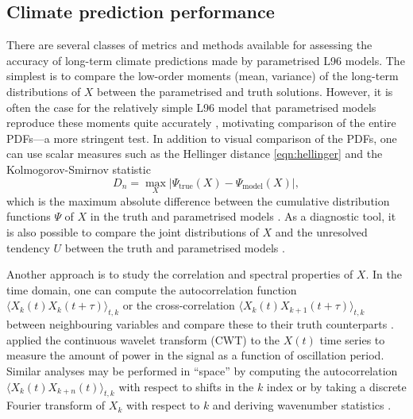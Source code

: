 \documentclass[../main.tex]{subfiles}
\begin{document}
\subsection{Climate prediction performance}
There are several classes of metrics and methods available for assessing the
accuracy of long-term climate predictions made by parametrised L96 models. The
simplest is to compare the low-order moments (mean, variance) of the long-term
distributions of $X$ between the parametrised and truth solutions. However, it
is often the case for the relatively simple L96 model that parametrised models
reproduce these moments quite accurately \parencite{wilks2005}, motivating
comparison of the entire PDFs---a more stringent test. In addition to visual
comparison of the PDFs, one can use scalar measures such as the Hellinger
distance \cref{eqn:hellinger} \parencite{arnold2013,gagne2020} and the
Kolmogorov-Smirnov statistic
\begin{equation*}
    D_n = \max_X |\Psi_\mathrm{true}(X) - \Psi_\mathrm{model}(X)|,
\end{equation*}
which is the maximum absolute difference between the cumulative distribution
functions $\Psi$ of $X$ in the truth and parametrised models
\parencite{wilks2005,chorin2015,kwasniok2012}. As a diagnostic tool, it is also
possible to compare the joint distributions of $X$ and the unresolved tendency
$U$ between the truth and parametrised models \parencite{gagne2020}.

Another approach is to study the correlation and spectral properties of $X$. In
the time domain, one can compute the autocorrelation function $\langle X_k(t)
X_k(t + \tau) \rangle_{t,k}$ or the cross-correlation $\langle X_k(t) X_{k+1}(t
+ \tau) \rangle_{t,k}$ between neighbouring variables and compare these to
their truth counterparts
\parencite{crommelin2008,kwasniok2012,chorin2015,gagne2020}.
\textcite{gagne2020} applied the continuous wavelet transform (CWT) to the
$X(t)$ time series to measure the amount of power in the signal as a function
of oscillation period. Similar analyses may be performed in ``space'' by
computing the autocorrelation $\langle X_k(t) X_{k+n}(t) \rangle_{t,k}$ with
respect to shifts in the $k$ index \parencite{gagne2020} or by taking a
discrete Fourier transform of $X_k$ with respect to $k$ and deriving wavenumber
statistics \parencite{crommelin2008,kwasniok2012}.
\end{document}

